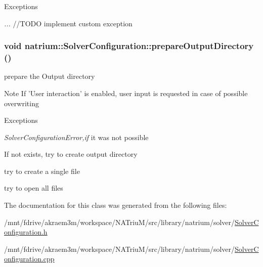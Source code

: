 \begin{DoxyExceptions}{Exceptions}
\item[{\em ...}]//TODO implement custom exception \end{DoxyExceptions}
\hypertarget{classnatrium_1_1SolverConfiguration_a69c009fd87690677b66ab10a000d07f6}{
\subsubsection[{prepareOutputDirectory}]{\setlength{\rightskip}{0pt plus 5cm}void natrium::SolverConfiguration::prepareOutputDirectory ()}}
\label{classnatrium_1_1SolverConfiguration_a69c009fd87690677b66ab10a000d07f6}


prepare the Output directory \begin{DoxyNote}{Note}
If 'User interaction' is enabled, user input is requested in case of possible overwriting 
\end{DoxyNote}

\begin{DoxyExceptions}{Exceptions}
\item[{\em SolverConfigurationError,if}]it was not possible \end{DoxyExceptions}


If not exists, try to create output directory

try to create a single file

try to open all files 

The documentation for this class was generated from the following files:\begin{DoxyCompactItemize}
\item 
/mnt/fdrive/akraem3m/workspace/NATriuM/src/library/natrium/solver/\hyperlink{SolverConfiguration_8h}{SolverConfiguration.h}\item 
/mnt/fdrive/akraem3m/workspace/NATriuM/src/library/natrium/solver/\hyperlink{SolverConfiguration_8cpp}{SolverConfiguration.cpp}\end{DoxyCompactItemize}
